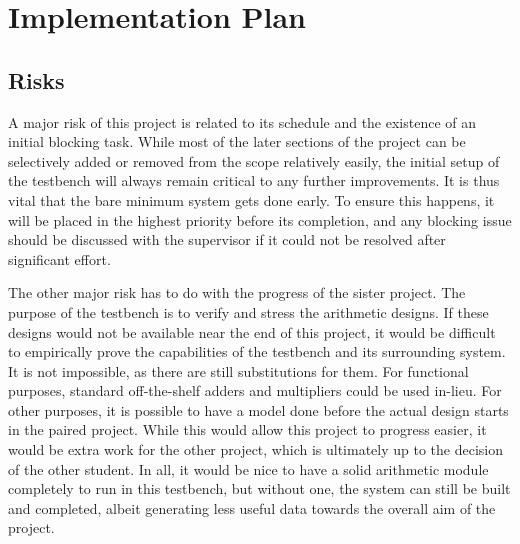 \documentclass[journal]{IEEEtran}
\begin{document}
\section{Implementation Plan}

\subsection{Risks}
A major risk of this project is related to its schedule and the existence of an
initial blocking task.
While most of the later sections of the project can be selectively added or
removed from the scope relatively easily, the initial setup of the testbench
will always remain critical to any further improvements.
It is thus vital that the bare minimum system gets done early.
To ensure this happens, it will be placed in the highest priority before its
completion, and any blocking issue should be discussed with the supervisor if it
could not be resolved after significant effort.

The other major risk has to do with the progress of the sister project.
The purpose of the testbench is to verify and stress the arithmetic designs.
If these designs would not be available near the end of this project,
it would be difficult to empirically prove the capabilities of the testbench
and its surrounding system.
It is not impossible, as there are still substitutions for them.
For functional purposes, standard off-the-shelf adders and multipliers could be
used in-lieu.
For other purposes, it is possible to have a model done before the actual design
starts in the paired project.
While this would allow this project to progress easier, it would be extra work
for the other project, which is ultimately up to the decision of the other
student.
In all, it would be nice to have a solid arithmetic module completely to run
in this testbench, but without one, the system can still be built and completed,
albeit generating less useful data towards the overall aim of the project.
\end{document}
